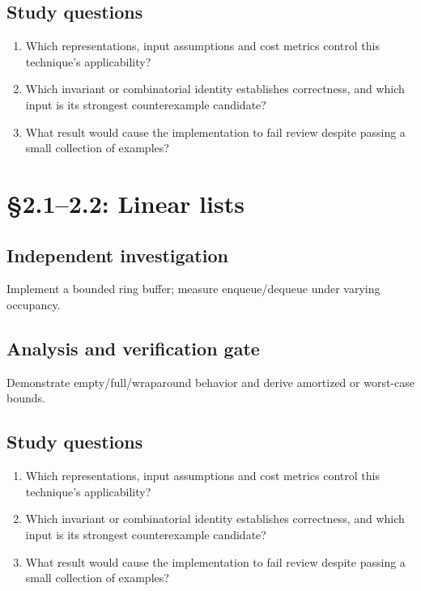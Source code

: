 \documentclass[11pt,letterpaper]{article}
\begin{document}
\subsection{Study questions}
\begin{enumerate}
\item Which representations, input assumptions and cost metrics control this technique's applicability?
\item Which invariant or combinatorial identity establishes correctness, and which input is its strongest counterexample candidate?
\item What result would cause the implementation to fail review despite passing a small collection of examples?
\end{enumerate}

\section{\S 2.1--2.2: Linear lists}
\subsection{Independent investigation}
Implement a bounded ring buffer; measure enqueue/dequeue under varying occupancy.
\subsection{Analysis and verification gate}
Demonstrate empty/full/wraparound behavior and derive amortized or worst-case bounds.
\subsection{Study questions}
\begin{enumerate}
\item Which representations, input assumptions and cost metrics control this technique's applicability?
\item Which invariant or combinatorial identity establishes correctness, and which input is its strongest counterexample candidate?
\item What result would cause the implementation to fail review despite passing a small collection of examples?
\end{enumerate}
\end{document}
